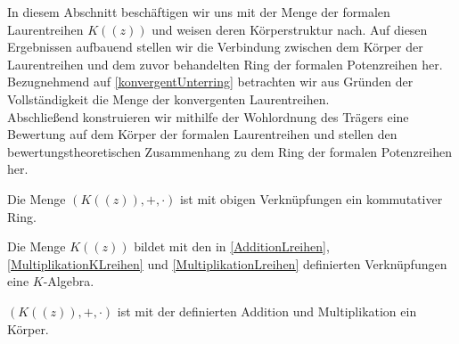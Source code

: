 In diesem Abschnitt beschäftigen wir uns mit der Menge der formalen Laurentreihen $K((z))$ und weisen deren Körperstruktur nach. Auf diesen Ergebnissen aufbauend stellen wir die Verbindung zwischen dem Körper der Laurentreihen und dem zuvor behandelten Ring der formalen Potenzreihen her. Bezugnehmend auf \ref{konvergentUnterring} betrachten wir aus Gründen der Vollständigkeit die Menge der konvergenten Laurentreihen. \\
Abschließend konstruieren wir mithilfe der Wohlordnung des Trägers eine Bewertung auf dem Körper der formalen Laurentreihen und stellen den bewertungstheoretischen Zusammenhang zu dem Ring der formalen Potenzreihen her.
%
%
% 
\begin{satz}
Die Menge $\left(K((z)), +, \cdot\right)$ ist mit obigen Verknüpfungen ein kommutativer Ring.
\end{satz}
%
%
%
%
%
%
%
\begin{bem}
Die Menge $K((z))$ bildet mit den in \ref{AdditionLreihen}, \ref{MultiplikationKLreihen} und \ref{MultiplikationLreihen} definierten Verknüpfungen eine $K$-Algebra.
\end{bem}
%
\begin{satz}\label{Laurentreihenkoerper} %
$\left(K((z)), +, \cdot\right)$ ist mit der definierten Addition und Multiplikation ein Körper. 
\end{satz}
